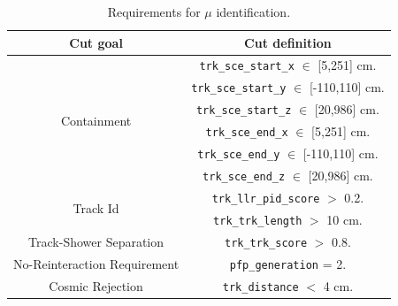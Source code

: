 \begin{table}[h!]
\centering
\setlength{\tabcolsep}{10pt}
\renewcommand{\arraystretch}{1.25}
 \begin{tabular}{| c | c |} 
 \hline
 Cut goal & Cut definition \\
 \hline\hline
\multirow{6}{*}{ Containment } &
     \texttt{trk\_sce\_start\_x} $\in$ [5,251] cm. \\&
     \texttt{trk\_sce\_start\_y} $\in$ [-110,110] cm.\\&
     \texttt{trk\_sce\_start\_z} $\in$ [20,986] cm.\\&
     \texttt{trk\_sce\_end\_x} $\in$ [5,251] cm.\\&
     \texttt{trk\_sce\_end\_y} $\in$ [-110,110] cm.\\&
     \texttt{trk\_sce\_end\_z} $\in$ [20,986] cm.\\
   \hline
 \multirow{2}{*}{ Track Id } &
     \texttt{trk\_llr\_pid\_score} $>$ 0.2.\\&
     \texttt{trk\_trk\_length} $>$ 10 cm.\\
     \hline
 \multirow{1}{*}{ Track-Shower Separation } &     
          \texttt{trk\_trk\_score} $>$ 0.8.\\ 
     \hline
 \multirow{1}{*}{ No-Reinteraction Requirement } &     
                    \texttt{pfp\_generation} = 2.\\
  \hline          
 \multirow{1}{*}{ Cosmic Rejection } & \texttt{trk\_distance} $<$ 4 cm.\\
 \hline
 \end{tabular}
 \caption{\label{tab:findthemuon} Requirements for $\mu$ identification.}
\end{table}



